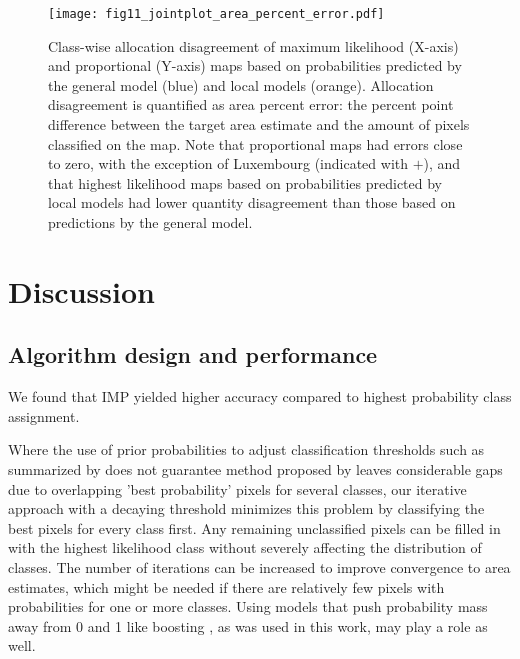     \begin{figure}[H]
    \vspace{-2cm}
        \centering
        \texttt{[image: fig11\_jointplot\_area\_percent\_error.pdf]}
        \caption{Class-wise allocation disagreement of maximum likelihood (X-axis) and proportional (Y-axis) maps based on probabilities predicted by the general model (blue) and local models (orange). Allocation disagreement is quantified as area percent error: the percent point difference between the target area estimate and the amount of pixels classified on the map. Note that proportional maps had errors close to zero, with the exception of Luxembourg (indicated with $+$), and that highest likelihood maps based on probabilities predicted by local models had lower quantity disagreement than those based on predictions by the general model.}
        \label{fig:quantity_disagreement}
    \end{figure}
    
\section{Discussion}

    \subsection{Algorithm design and performance}

        We found that IMP yielded higher accuracy compared to highest probability class assignment. 
    
        Where the use of prior probabilities to adjust classification thresholds such as summarized by \citet{mingguo2009effect} does not guarantee  method proposed by \citep{horvath2021comparison} leaves considerable gaps due to overlapping 'best probability' pixels for several classes, our iterative approach with a decaying threshold minimizes this problem by classifying the best pixels for every class first. Any remaining unclassified pixels can be filled in with the highest likelihood class without severely affecting the distribution of classes. The number of iterations can be increased to improve convergence to area estimates, which might be needed if there are relatively few pixels with probabilities for one or more classes. Using models that push probability mass away from 0 and 1 like boosting \citep{niculescu2005predicting}, as was used in this work, may play a role as well.
    
